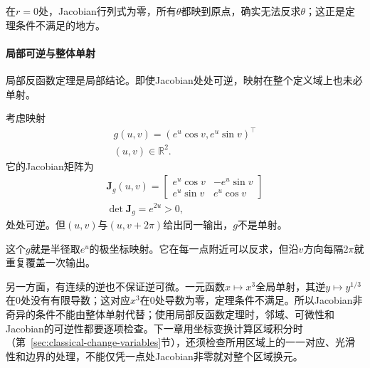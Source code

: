 在$r=0$处，Jacobian行列式为零，所有$\theta$都映到原点，确实无法反求$\theta$；这正是定理条件不满足的地方。

\paragraph{局部可逆与整体单射}

局部反函数定理是局部结论。即使Jacobian处处可逆，映射在整个定义域上也未必单射。
\begin{example}[Jacobian处处可逆而不单射]
\label{ex:multivariable-local-not-global-inverse}
考虑映射
\[
\begin{gathered}
g(u,v)=(e^u\cos v,e^u\sin v)^\top\\
(u,v)\in\mathbb R^2.
\end{gathered}
\]
它的Jacobian矩阵为
\[
\begin{gathered}
\bm J_g(u,v)=\begin{bmatrix}e^u\cos v&-e^u\sin v\\ e^u\sin v&e^u\cos v\end{bmatrix}\\
\det\bm J_g=e^{2u}>0,
\end{gathered}
\]
处处可逆。但$(u,v)$与$(u,v+2\pi)$给出同一输出，$g$不是单射。
\end{example}

这个$g$就是半径取$e^u$的极坐标映射。它在每一点附近可以反求，但沿$v$方向每隔$2\pi$就重复覆盖一次输出。

另一方面，有连续的逆也不保证逆可微。一元函数$x\mapsto x^3$全局单射，其逆$y\mapsto y^{1/3}$在$0$处没有有限导数；这对应$x^3$在$0$处导数为零，定理条件不满足。所以Jacobian非奇异的条件不能由整体单射代替；使用局部反函数定理时，邻域、可微性和Jacobian的可逆性都要逐项检查。下一章用坐标变换计算区域积分时（第~\ref{sec:classical-change-variables}节），还须检查所用区域上的一一对应、光滑性和边界的处理，不能仅凭一点处Jacobian非零就对整个区域换元。

\FloatBarrier
